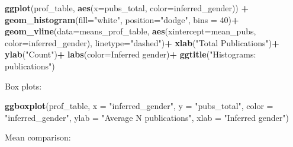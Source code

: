 \documentclass[
]{article}
\newenvironment{Shaded}{\begin{snugshade}}{\end{snugshade}}
\newcommand{\AttributeTok}[1]{\textcolor[rgb]{0.13,0.29,0.53}{#1}}
\newcommand{\DecValTok}[1]{\textcolor[rgb]{0.00,0.00,0.81}{#1}}
\newcommand{\FunctionTok}[1]{\textcolor[rgb]{0.13,0.29,0.53}{\textbf{#1}}}
\newcommand{\NormalTok}[1]{#1}
\newcommand{\SpecialCharTok}[1]{\textcolor[rgb]{0.81,0.36,0.00}{\textbf{#1}}}
\newcommand{\StringTok}[1]{\textcolor[rgb]{0.31,0.60,0.02}{#1}}
\begin{document}
\begin{Shaded}
\begin{Highlighting}[]
\FunctionTok{ggplot}\NormalTok{(prof\_table, }\FunctionTok{aes}\NormalTok{(}\AttributeTok{x=}\NormalTok{pubs\_total, }\AttributeTok{color=}\NormalTok{inferred\_gender)) }\SpecialCharTok{+}
  \FunctionTok{geom\_histogram}\NormalTok{(}\AttributeTok{fill=}\StringTok{"white"}\NormalTok{, }\AttributeTok{position=}\StringTok{"dodge"}\NormalTok{, }\AttributeTok{bins =} \DecValTok{40}\NormalTok{)}\SpecialCharTok{+}
  \FunctionTok{geom\_vline}\NormalTok{(}\AttributeTok{data=}\NormalTok{means\_prof\_table, }\FunctionTok{aes}\NormalTok{(}\AttributeTok{xintercept=}\NormalTok{mean\_pubs, }\AttributeTok{color=}\NormalTok{inferred\_gender),}
             \AttributeTok{linetype=}\StringTok{"dashed"}\NormalTok{)}\SpecialCharTok{+}
  \FunctionTok{xlab}\NormalTok{(}\StringTok{"Total Publications"}\NormalTok{)}\SpecialCharTok{+}
  \FunctionTok{ylab}\NormalTok{(}\StringTok{"Count"}\NormalTok{)}\SpecialCharTok{+}
  \FunctionTok{labs}\NormalTok{(}\AttributeTok{color=}\StringTok{\textquotesingle{}Inferred gender\textquotesingle{}}\NormalTok{)}\SpecialCharTok{+}
  \FunctionTok{ggtitle}\NormalTok{(}\StringTok{"Histograms: publications"}\NormalTok{)}
\end{Highlighting}
\end{Shaded}

Box plots:

\begin{Shaded}
\begin{Highlighting}[]
\FunctionTok{ggboxplot}\NormalTok{(prof\_table, }\AttributeTok{x =} \StringTok{"inferred\_gender"}\NormalTok{, }\AttributeTok{y =} \StringTok{"pubs\_total"}\NormalTok{, }
          \AttributeTok{color =} \StringTok{"inferred\_gender"}\NormalTok{,}
          \AttributeTok{ylab =} \StringTok{"Average N publications"}\NormalTok{, }\AttributeTok{xlab =} \StringTok{"Inferred gender"}\NormalTok{)}
\end{Highlighting}
\end{Shaded}

Mean comparison:

\begin{Shaded}
\end{Shaded}
\end{document}
